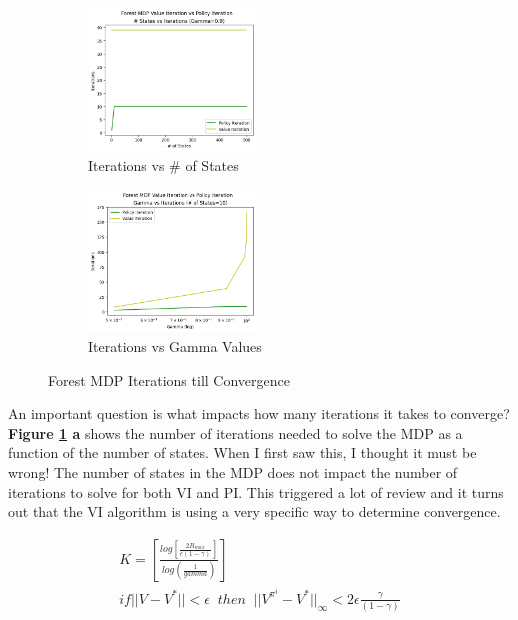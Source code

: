 \documentclass[letterpaper]{article} %
\begin{document}
\begin{figure}[!htb]
	\begin{subfigure}[b]{0.25\textwidth}
	\centering
		\includegraphics[width=1.75in]{Figures/Forest_MDP_Value_Iteration_vs_Policy_Iteration_num_States_vs_Iterations_Gamma_0_9.png}
		\caption{Iterations vs \# of States}
  	\end{subfigure}%
	\begin{subfigure}[b]{0.25\textwidth}
	\centering
		\includegraphics[width=1.75in]{Figures/Forest_MDP_Value_Iteration_vs_Policy_Iteration_Gamma_vs_Iterations_num_of_States_10.png}
		\caption{Iterations vs Gamma Values}
  	\end{subfigure}%
\caption{Forest MDP Iterations till Convergence}
\label{fig:forest_states_vs_iterations}
\end{figure}

An important question is what impacts how many iterations it takes to converge?  \textbf{Figure \ref{fig:forest_states_vs_iterations} a} shows the number of iterations needed to solve the MDP as a function of the number of states.  When I first saw this, I thought it must be wrong!  The number of states in the MDP does not impact the number of iterations to solve for both VI and PI.  This triggered a lot of review and it turns out that the VI algorithm is using a very specific way to determine convergence.  

\begin{equation} 
\label{eq:vi_convergence}
\begin{gathered}
K = \left[ \frac{ log \left[ \frac{2R_{max} }{\epsilon (1 - \gamma)}\right] } {log(\frac{1} {gamma})}\right]\\
if || V - V^* || < \epsilon \;\; then \;\; ||V^{\pi^i} - V^*||_\infty < 2 \epsilon \frac{\gamma}{(1 - \gamma)}
\end{gathered}
\end{equation}
\end{document}
